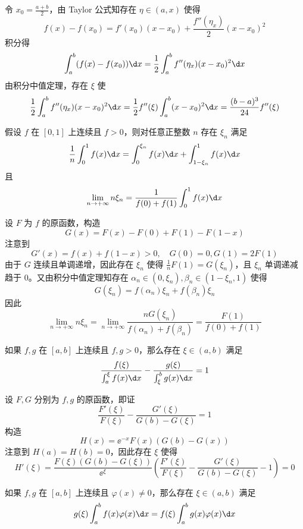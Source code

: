 \begin{solution}
	令 $x_0 = \frac{a+b}{2}$，由 Taylor 公式知存在 $\eta \in (a, x)$ 使得
	\[ f(x) - f(x_0) = f'(x_0)(x - x_0) + \frac{f''(\eta_x)}{2} (x - x_0)^2 \]
	积分得
	\[ \int_{a}^{b} (f(x) - f(x_0)) \d x = \frac{1}{2} \int_{a}^{b} f''(\eta_x) (x - x_0)^2 \d x  \]
	由积分中值定理，存在 $\xi$ 使
	\[ \frac{1}{2} \int_{a}^{b} f''(\eta_x) (x - x_0)^2 \d x = \frac{1}{2} f''(\xi) \int_{a}^{b} (x - x_0)^2 \d x = \frac{(b-a)^3}{24} f''(\xi)   \]
\end{solution}

\begin{problem}[000050]
假设 $f$ 在 $[0, 1]$ 上连续且 $f > 0$，则对任意正整数 $n$ 存在 $\xi_n$ 满足
\[ \frac{1}{n} \int_{0}^{1} f(x) \d x = \int_{0}^{\xi_n} f(x) \d x + \int_{1 - \xi_n}^{1} f(x) \d x \]
且
\[ \lim_{n \to +\infty} n \xi_n = \frac{1}{f(0) + f(1)} \int_{0}^{1} f(x) \d x \]
\end{problem}

\begin{solution}
	设 $F$ 为 $f$ 的原函数，构造
	\[ G(x) = F(x) - F(0) + F(1) - F(1 - x) \]
	注意到
	\[ G'(x) = f(x) + f(1 - x) > 0, \quad G(0) = 0, G(1) = 2F(1) \]
	由于 $G$ 连续且单调递增，因此存在 $\xi_n$ 使得 $\frac{1}{n}F(1) = G(\xi_n)$，且 $\xi_n$ 单调递减趋于 $0$。又由积分中值定理知存在 $\alpha_n \in (0, \xi_n), \beta_n \in (1-\xi_n, 1)$ 使得
	\[ G(\xi_n) = f(\alpha_n) \xi_n + f(\beta_n) \xi_n \]
	因此
	\[ \lim_{n \to +\infty} n \xi_n = \lim_{n \to +\infty} \frac{n G(\xi_n)}{f(\alpha_n) + f(\beta_n)} = \frac{F(1)}{f(0) + f(1)} \]
\end{solution}

\begin{problem}[000051]
如果 $f,g$ 在 $[a,b]$ 上连续且 $f, g > 0$，那么存在 $\xi \in (a,b)$ 满足
\[ \frac{f(\xi)}{\int_{a}^{\xi} f(x) \d x} - \frac{g(\xi)}{\int_{\xi}^{b} g(x) \d x} = 1 \]
\end{problem}

\begin{solution}
	设 $F, G$ 分别为 $f, g$ 的原函数，即证
	\[ \frac{F'(\xi)}{F(\xi)} - \frac{G'(\xi)}{G(b) - G(\xi)} = 1 \]
	构造
	\[ H(x) = \ee^{-x} F(x) (G(b) - G(x)) \]
	注意到 $H(a) = H(b) = 0$，因此存在 $\xi$ 使得
	\[ H'(\xi) = \frac{F(\xi) (G(b) - G(\xi))}{\ee^{\xi}} \left(\frac{F'(\xi)}{F(\xi)} - \frac{G'(\xi)}{G(b) - G(\xi)} - 1\right) = 0 \]
\end{solution}

\begin{problem}[000052]
如果 $f,g$ 在 $[a,b]$ 上连续且 $\varphi(x) \neq 0$，那么存在 $\xi \in (a,b)$ 满足
\[ g(\xi) \int_{a}^{b} f(x) \varphi(x) \d x = f(\xi) \int_{a}^{b} g(x) \varphi(x) \d x \]
\end{problem}

